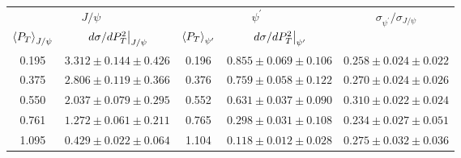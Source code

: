 \begin{tabular}{cc|cc|c}
\hline
\multicolumn{2}{c|}{$J/\psi$} &
  \multicolumn{2}{c|}{$\psi^{\prime}$} &
  \multirow{2}{*}{$\sigma_{\psi^\prime}/\sigma_{J/\psi}$} \\ \cline{1-4}
$\expval{P_T}_{J/\psi}$ &
  $\eval{d\sigma/dP^2_T}_{J/\psi}$ &
  $\expval{P_T}_{\psi^\prime}$ &
  $\eval{d\sigma/dP^2_T}_{\psi^\prime}$ &
   \\ \hline
0.195 & $3.312\pm0.144\pm0.426$ & 0.196 & $0.855\pm0.069\pm0.106$ & $0.258\pm0.024\pm0.022$ \\
0.375 & $2.806\pm0.119\pm0.366$ & 0.376 & $0.759\pm0.058\pm0.122$ & $0.270\pm0.024\pm0.026$ \\
0.550 & $2.037\pm0.079\pm0.295$ & 0.552 & $0.631\pm0.037\pm0.090$ & $0.310\pm0.022\pm0.024$ \\
0.761 & $1.272\pm0.061\pm0.211$ & 0.765 & $0.298\pm0.031\pm0.108$ & $0.234\pm0.027\pm0.051$ \\
1.095 & $0.429\pm0.022\pm0.064$ & 1.104 & $0.118\pm0.012\pm0.028$ & $0.275\pm0.032\pm0.036$ \\ \hline
\end{tabular}
